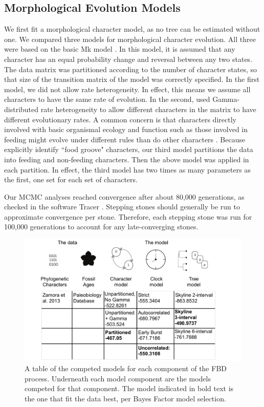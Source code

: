 \documentclass{article}
\begin{document}
\subsection{Morphological Evolution Models}
We first fit a morphological character model, as no tree can be estimated without one.
We compared three models for morphological character evolution. 
All three were based on the basic Mk model \citep{Lewis2001}. 
In this model, it is assumed that any character has an equal probability change and reversal between any two states. 
The data matrix was partitioned according to the number of character states, so that size of the transition matrix of the model was correctly specified.
In the first model, we did not allow rate heterogeneity. 
In effect, this means we assume all characters to have the same rate of evolution.
In the second, used Gamma-distributed rate heterogeneity to allow different characters in the matrix to have different evolutionary rates.
A common concern is that characters directly involved with basic organismal ecology and function such as those involved in feeding might evolve under different rules than do other characters \citep{Foote1994,Foote1996a,Wagner1995,Sanchez-Villagra1998,Ciampaglio2002,HopkinsSmith2015}. Because \citet{SmithZamora2009} explicitly identify ``food groove" characters, our third model partitions the data into feeding and non-feeding characters.
Then the above model was applied in each partition.
In effect, the third model has two times as many parameters as the first, one set for each set of characters.

Our MCMC analyses reached convergence after about 80,000 generations, as checked in the software Tracer \citep{Rambaut2018}. 
Stepping stones should generally be run to approximate convergence per stone.
Therefore, each stepping stone was run for 100,000 generations to account for any late-converging stones.

\begin{figure}
  \includegraphics[width=\textwidth]{figures/Fig2.pdf}

  \caption{A table of the competed models for each component of the FBD process. Underneath each model component are the models competed for that component. The model indicated in bold text is the one that fit the data best, per Bayes Factor model selection.}
\end{figure}
\end{document}
